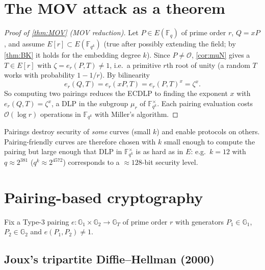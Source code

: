 \documentclass[11pt,a4paper,oneside]{book}
\theoremstyle{plain}
\theoremstyle{definition}
\theoremstyle{remark}
\newcommand{\F}{\mathbb{F}}
\newcommand{\Fq}{\mathbb{F}_q}
\newcommand{\Oinf}{\mathcal{O}}
\newcommand{\bigO}{\mathcal{O}}
\begin{document}
\section{The MOV attack as a theorem}

\begin{proof}[Proof of \cref{thm:MOV} (MOV reduction)]
Let $P\in E(\Fq)$ of prime order $r$, $Q=xP$, and assume $E[r]\subset E(\F_{q^k})$ (true after possibly extending the field; by \cref{thm:BK} it holds for the embedding degree $k$). Since $P\ne\Oinf$, \cref{cor:muN} gives a $T\in E[r]$ with $\zeta=e_r(P,T)\ne1$, i.e.\ a primitive $r$th root of unity (a random $T$ works with probability $1-1/r$). By bilinearity
\[
e_r(Q,T)=e_r(xP,T)=e_r(P,T)^x=\zeta^x .
\]
So computing two pairings reduces the ECDLP to finding the exponent $x$ with $e_r(Q,T)=\zeta^x$, a DLP in the subgroup $\mu_r$ of $\F_{q^k}^\times$. Each pairing evaluation costs $\bigO(\log r)$ operations in $\F_{q^k}$ with Miller's algorithm.
\end{proof}

\begin{keyidea}
Pairings destroy security of \emph{some} curves (small $k$) and enable protocols on others. Pairing-friendly curves are therefore chosen with $k$ small enough to compute the pairing but large enough that DLP in $\F_{q^k}^\times$ is as hard as in $E$: e.g.\ $k=12$ with $q\approx2^{381}$ ($q^k\approx2^{4572}$) corresponds to a $\approx 128$-bit security level.
\end{keyidea}

\section{Pairing-based cryptography}

Fix a Type-3 pairing $e:\mathbb G_1\times\mathbb G_2\to\mathbb G_T$ of prime order $r$ with generators $P_1\in\mathbb G_1$, $P_2\in\mathbb G_2$ and $e(P_1,P_2)\ne1$.

\subsection{Joux's tripartite Diffie--Hellman (2000)}
\end{document}
